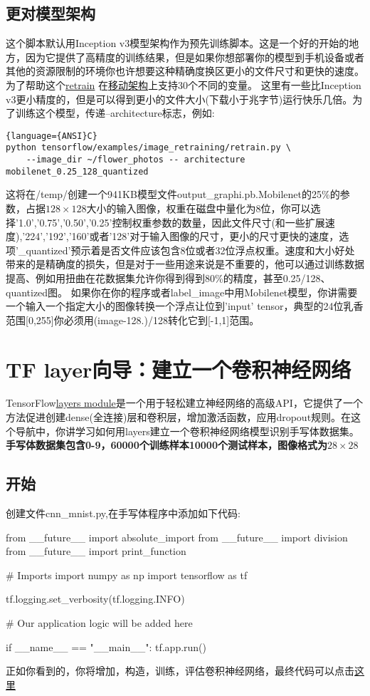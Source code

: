 \subsection{更对模型架构}
这个脚本默认用Inception v3模型架构作为预先训练脚本。这是一个好的开始的地方，因为它提供了高精度的训练结果，但是如果你想部署你的模型到手机设备或者其他的资源限制的环境你也许想要这种精确度换区更小的文件尺寸和更快的速度。
为了帮助这个\href{https://github.com/tensorflow/tensorflow/blob/master/tensorflow/examples/image_retraining/retrain.py}{retrain}
在\href{https://research.googleblog.com/2017/06/mobilenets-open-source-models-for.html}{移动架构}上支持30个不同的变量。
这里有一些比Inception v3更小精度的，但是可以得到更小的文件大小(下载小于兆字节)运行快乐几倍。为了训练这个模型，传递--architecture标志，例如:
\begin{lstlisting}{language={ANSI}C}
python tensorflow/examples/image_retraining/retrain.py \
    --image_dir ~/flower_photos -- architecture mobilenet_0.25_128_quantized
\end{lstlisting}
这将在/temp/创建一个941KB模型文件output\_graphi.pb.Mobilenet的25\%的参数，占据$128\times128$大小的输入图像，权重在磁盘中量化为8位，你可以选择'1.0','0.75','0.50','0.25'控制权重参数的数量，因此文件尺寸(和一些扩展速度),'224','192','160'或者'128'对于输入图像的尺寸，更小的尺寸更快的速度，选项'\_quantized'预示着是否文件应该包含8位或者32位浮点权重。速度和大小好处带来的是精确度的损失，但是对于一些用途来说是不重要的，他可以通过训练数据提高、例如用扭曲在花数据集允许你得到得到80\%的精度，甚至0.25/128、quantized图。
如果你在你的程序或者label\_image中用Mobilenet模型，你讲需要一个输入一个指定大小的图像转换一个浮点让位到'input' tensor，典型的24位乳香范围[0,255]你必须用(image-128.)/128转化它到[-1,1]范围。
\section{TF layer向导：建立一个卷积神经网络}
TensorFlow\href{https://www.tensorflow.org/api_docs/python/tf/layers}{layers module}是一个用于轻松建立神经网络的高级API，它提供了一个方法促进创建dense(全连接)层和卷积层，增加激活函数，应用dropout规则。在这个导航中，你讲学习如何用layers建立一个卷积神经网络模型识别手写体数据集。
\textbf{手写体数据集包含0-9，60000个训练样本10000个测试样本，图像格式为}$28\times28$
\subsection{开始}
创建文件cnn\_mnist.py,在手写体程序中添加如下代码:
\begin{python}
from __future__ import absolute_import
from __future__ import division
from __future__ import print_function

# Imports
import numpy as np
import tensorflow as tf

tf.logging.set_verbosity(tf.logging.INFO)

# Our application logic will be added here

if __name__ == "__main__":
  tf.app.run()
\end{python}
正如你看到的，你将增加，构造，训练，评估卷积神经网络，最终代码可以点击\href{https://www.github.com/tensorflow/tensorflow/blob/r1.3/tensorflow/examples/tutorials/layers/cnn_mnist.py}{这里}
